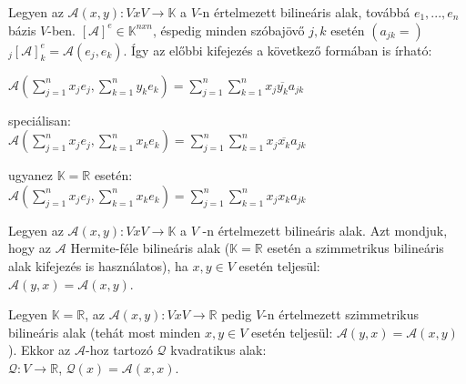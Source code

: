 	\begin{frame}
		\begin{tcolorbox}[title={Def.: Bilineáris alak}]
 			Legyen az $\mathcal{\mathcal{A}}(x, y) : V x V \rightarrow \mathbb{K}$ a $V$-n értelmezett bilineáris alak, továbbá $e_1, ..., e_n$ bázis $V$-ben. $[\mathcal{A}]^e \in \mathbb{K}^{nxn}$, éspedig minden szóbajövő $j, k$ esetén $(a_{jk} =)$ ${}_{j} [\mathcal{A}]_k^e =
\mathcal{A}(e_j, e_k)$.
			Így az előbbi kifejezés a következő formában is írható:\\
			\mmedskip
			
			$\mathcal{A}(\sum_{j = 1}^n x_je_j, \sum_{k = 1}^n y_ke_k) = \sum_{j = 1}^n \sum_{k = 1}^n x_j \overline{y_k} a_{jk}$\\
			\mmedskip
			
			speciálisan:\\
			$\mathcal{A}(\sum_{j = 1}^n x_je_j, \sum_{k = 1}^n x_ke_k) = \sum_{j = 1}^n \sum_{k = 1}^n x_j \overline{x_k} a_{jk}$\\
			\mmedskip
			
			ugyanez $\mathbb{K} = \mathbb{R}$ esetén:\\
			$\mathcal{A}(\sum_{j = 1}^n x_je_j, \sum_{k = 1}^n x_ke_k) = \sum_{j = 1}^n \sum_{k = 1}^n x_j x_k a_{jk}$\\
		\end{tcolorbox}		

		\begin{tcolorbox}[title={Def.: Hermite-féle bilineáris alak}]
			Legyen az $\mathcal{A}(x, y) : V x V \rightarrow \mathbb{K}$ a $V$ -n értelmezett bilineáris alak. Azt mondjuk, hogy az $\mathcal{A}$ Hermite-féle bilineáris alak ($\mathbb{K}  = \mathbb{R}$ esetén a szimmetrikus bilineáris alak kifejezés is használatos), ha $x, y \in V$ esetén teljesül:\\
			$\mathcal{A}(y, x) = \mathcal{A}(x, y)$.
		\end{tcolorbox}	
		
		\begin{tcolorbox}[title={Def.: Szimmetrikus bilineáris alak}]
			Legyen $\mathbb{K}  = \mathbb{R}$, az $\mathcal{A}(x, y) : V x V \rightarrow \mathbb{R}$ pedig $V$-n értelmezett szimmetrikus bilineáris alak (tehát most minden $x, y \in V$ esetén teljesül: $\mathcal{A}(y, x) = \mathcal{A}(x, y)$). Ekkor az $\mathcal{A}$-hoz tartozó $\mathcal{Q}$ kvadratikus alak:\\
			 $\mathcal{Q} : V \rightarrow \mathbb{R}$, $\mathcal{Q}(x) = \mathcal{A}(x, x)$.
		\end{tcolorbox}		
		

\end{frame}
